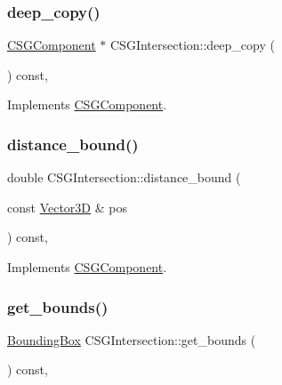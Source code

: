 \subsubsection{\texorpdfstring{deep\_copy()}{deep\_copy()}}
{\footnotesize\ttfamily \mbox{\hyperlink{classCSGComponent}{C\+S\+G\+Component}} $\ast$ C\+S\+G\+Intersection\+::deep\+\_\+copy (\begin{DoxyParamCaption}{ }\end{DoxyParamCaption}) const\hspace{0.3cm}{\ttfamily [override]}, {\ttfamily [virtual]}}



Implements \mbox{\hyperlink{classCSGComponent_a98d3accd23c28259cbf490f4d7acbe83}{C\+S\+G\+Component}}.

\mbox{\label{classCSGIntersection_a199cc8192cdaeacae17d5b3c6dfef6a1}} 
\subsubsection{\texorpdfstring{distance\_bound()}{distance\_bound()}}
{\footnotesize\ttfamily double C\+S\+G\+Intersection\+::distance\+\_\+bound (\begin{DoxyParamCaption}\item[{const \mbox{\hyperlink{classVector3D}{Vector3D}} \&}]{pos }\end{DoxyParamCaption}) const\hspace{0.3cm}{\ttfamily [override]}, {\ttfamily [virtual]}}



Implements \mbox{\hyperlink{classCSGComponent_a41ca7aff9b7c481ea076f81eeb826779}{C\+S\+G\+Component}}.

\mbox{\label{classCSGIntersection_ad1f53a70c93dcdb6f8725a491fa24917}} 
\subsubsection{\texorpdfstring{get\_bounds()}{get\_bounds()}}
{\footnotesize\ttfamily \mbox{\hyperlink{classBoundingBox}{Bounding\+Box}} C\+S\+G\+Intersection\+::get\+\_\+bounds (\begin{DoxyParamCaption}{ }\end{DoxyParamCaption}) const\hspace{0.3cm}{\ttfamily [override]}, {\ttfamily [virtual]}}



